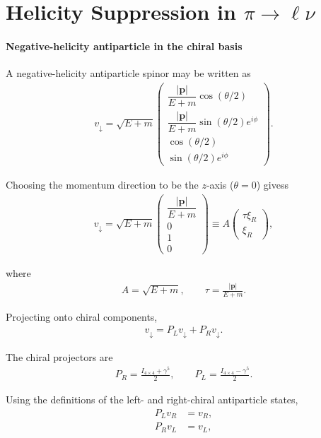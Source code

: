 \section{\texorpdfstring{Helicity Suppression in $\pi\to\ell\nu$}{Helicity Suppression in pi to l nu}}

\paragraph{Negative-helicity antiparticle in the chiral basis}

A negative-helicity antiparticle spinor may be written as
\begin{align}
v_\downarrow
=
\sqrt{E+m}
\begin{pmatrix}
\dfrac{|\mathbf{p}|}{E+m}\cos(\theta/2) \\
\dfrac{|\mathbf{p}|}{E+m}\sin(\theta/2)e^{i\phi} \\
\cos(\theta/2) \\
\sin(\theta/2)e^{i\phi}
\end{pmatrix}.
\end{align}

Choosing the momentum direction to be the \(z\)-axis (\(\theta = 0\)) givess
\begin{align}
v_\downarrow
=
\sqrt{E+m}
\begin{pmatrix}
\dfrac{|\mathbf{p}|}{E+m} \\
0 \\
1 \\
0
\end{pmatrix}
\equiv
A
\begin{pmatrix}
\tau \xi_R \\
\xi_R
\end{pmatrix},
\end{align}

where
\begin{align}
A = \sqrt{E+m},
\qquad
\tau = \frac{|\mathbf{p}|}{E+m}.
\end{align}

Projecting onto chiral components,
\begin{align}
v_\downarrow = P_L v_\downarrow + P_R v_\downarrow .
\end{align}

The chiral projectors are
\begin{align}
P_R
=
\frac{I_{4\times 4}+\gamma^5}{2},
\qquad
P_L
=
\frac{I_{4\times 4}-\gamma^5}{2}.
\end{align}

Using the definitions of the left- and right-chiral antiparticle states,
\begin{align}
P_L v_R &= v_R, \\
P_R v_L &= v_L ,
\end{align}

